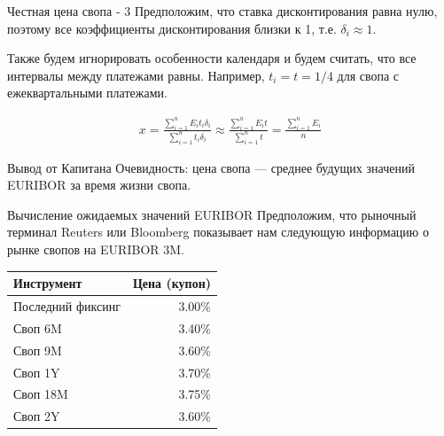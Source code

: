 \documentclass{beamer}
\begin{document}
\begin{frame}{Честная цена свопа - 3}
\justify
Предположим, что ставка дисконтирования равна нулю, поэтому все коэффициенты дисконтирования близки к 1, т.е. $\delta_i \approx1$.

\justify
Также будем игнорировать особенности календаря и будем считать, что все интервалы между платежами равны. Например, $t_i = t = 1/4$ для свопа с ежеквартальными платежами.

\begin{align*}
x = \frac{\sum\limits_{i=1}^{n} E_i t_i \delta_i}{\sum\limits_{i=1}^{n} t_i \delta_i}
\approx
\frac{\sum\limits_{i=1}^{n} E_i t}{\sum\limits_{i=1}^{n} t}
=
\frac{\sum\limits_{i=1}^{n} E_i}{n}
\end{align*}

\justify
Вывод от Капитана Очевидность: цена свопа --- среднее будущих значений EURIBOR за время жизни свопа.
\end{frame}



\begin{frame}{Вычисление ожидаемых значений EURIBOR}
\justify
Предположим, что рыночный терминал Reuters или Bloomberg показывает нам следующую информацию о рынке свопов на EURIBOR 3M.

\justify
\centering
\begin{tabular}{l|r}
Инструмент        & Цена (купон) \\ \hline
Последний фиксинг & 3.00\% \\
Своп 6M           & 3.40\% \\
Своп 9M           & 3.60\% \\
Своп 1Y           & 3.70\% \\
Своп 18M          & 3.75\% \\
Своп 2Y           & 3.60\%
\end{tabular}

\end{frame}
\end{document}
